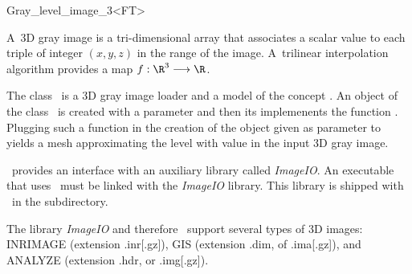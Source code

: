 

\begin{ccRefClass}{Gray_level_image_3<FT>}  %


\ccDefinition

 A~3D gray image is a
tri-dimensional array that associates a scalar value to each triple of
integer $(x, y, z)$ in the range of the image. A~trilinear interpolation
algorithm provides a map \begin{math}f : \R^3 \longrightarrow \R\end{math}.

The class \ccRefName\ is a 3D gray image loader and a model
of the concept .
An object of the class \ccRefName\  is created with a parameter
 and then its   implemenents
the function .
Plugging such a function in the creation of the 
object given as parameter  to  yields
a mesh approximating the level with value 
in the input 3D gray image.
 


\ccRefName\ provides an interface with an auxiliary library called
\emph{ImageIO}. An executable that uses \ccRefName\ must be linked with the \emph{ImageIO}
library. This library is shipped with \cgal\ in the
 subdirectory.

The library \emph{ImageIO} and therefore \ccRefName\ support
several types of 3D images: INRIMAGE (extension .inr[.gz]), GIS (extension
.dim, of .ima[.gz]), and ANALYZE (extension .hdr, or .img[.gz]).



\end{ccRefClass}
